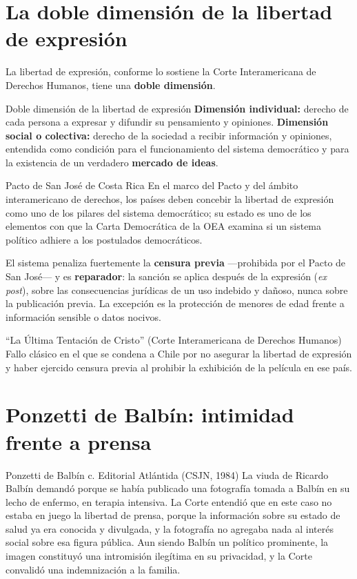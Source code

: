 \documentclass[12pt,oneside]{book}
\begin{document}
\section{La doble dimensión de la libertad de expresión}

La libertad de expresión, conforme lo sostiene la Corte Interamericana de Derechos Humanos, tiene una \textbf{doble dimensión}.

\begin{definition}{Doble dimensión de la libertad de expresión}
\textbf{Dimensión individual:} derecho de cada persona a expresar y difundir su pensamiento y opiniones. \textbf{Dimensión social o colectiva:} derecho de la sociedad a recibir información y opiniones, entendida como condición para el funcionamiento del sistema democrático y para la existencia de un verdadero \textbf{mercado de ideas}.
\end{definition}

\begin{norma}{Pacto de San José de Costa Rica}
En el marco del Pacto y del ámbito interamericano de derechos, los países deben concebir la libertad de expresión como uno de los pilares del sistema democrático; su estado es uno de los elementos con que la Carta Democrática de la OEA examina si un sistema político adhiere a los postulados democráticos.
\end{norma}

El sistema penaliza fuertemente la \textbf{censura previa} ---prohibida por el Pacto de San José--- y es \textbf{reparador}: la sanción se aplica después de la expresión (\emph{ex post}), sobre las consecuencias jurídicas de un uso indebido y dañoso, nunca sobre la publicación previa. La excepción es la protección de menores de edad frente a información sensible o datos nocivos.

\begin{example}{``La Última Tentación de Cristo'' (Corte Interamericana de Derechos Humanos)}
Fallo clásico en el que se condena a Chile por no asegurar la libertad de expresión y haber ejercido censura previa al prohibir la exhibición de la película en ese país.
\end{example}

\section{Ponzetti de Balbín: intimidad frente a prensa}

\begin{example}{Ponzetti de Balbín c. Editorial Atlántida (CSJN, 1984)}
La viuda de Ricardo Balbín demandó porque se había publicado una fotografía tomada a Balbín en su lecho de enfermo, en terapia intensiva. La Corte entendió que en este caso no estaba en juego la libertad de prensa, porque la información sobre su estado de salud ya era conocida y divulgada, y la fotografía no agregaba nada al interés social sobre esa figura pública. Aun siendo Balbín un político prominente, la imagen constituyó una intromisión ilegítima en su privacidad, y la Corte convalidó una indemnización a la familia.
\end{example}
\end{document}
